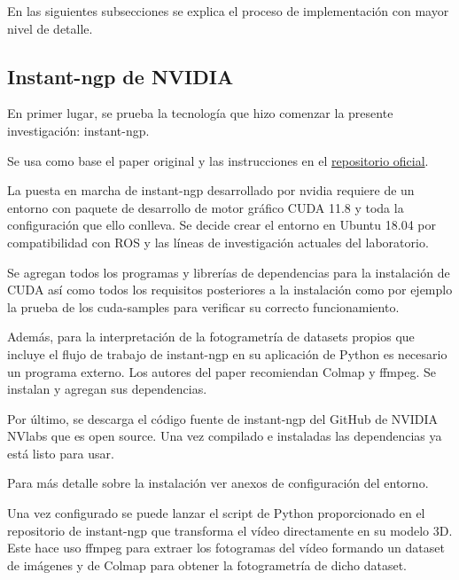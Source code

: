 \documentclass[a4paper, 12pt, spanish, twoside]{article}
\begin{document}
En las siguientes subsecciones se explica el proceso de implementación con mayor nivel de detalle. 





\subsection{Instant-ngp de NVIDIA} 

En primer lugar, se prueba la tecnología que hizo comenzar la presente investigación: \gls{instant-ngp}. 

Se usa como base el paper original y las instrucciones en el \href{https://github.com/NVlabs/instant-ngp}{repositorio oficial}.  

La puesta en marcha de \gls{instant-ngp} desarrollado por \gls{nvidia} requiere de un entorno con paquete de desarrollo de motor gráfico CUDA 11.8 y toda la configuración que ello conlleva. Se decide crear el entorno en Ubuntu 18.04 por compatibilidad con ROS y las líneas de investigación actuales del laboratorio. 

Se agregan todos los programas y librerías de dependencias para la instalación de CUDA así como todos los requisitos posteriores a la instalación como por ejemplo la prueba de los cuda-samples para verificar su correcto funcionamiento. 

Además, para la interpretación de la fotogrametría de datasets propios que incluye el flujo de trabajo de instant-ngp en su aplicación de Python es necesario un programa externo. Los autores del paper recomiendan Colmap y ffmpeg. Se instalan y agregan sus dependencias. 

Por último, se descarga el código fuente de instant-ngp del GitHub de NVIDIA NVlabs que es open source. Una vez compilado e instaladas las dependencias ya está listo para usar. 

Para más detalle sobre la instalación ver anexos de configuración del entorno. 

Una vez configurado se puede lanzar el script de Python proporcionado en el repositorio de instant-ngp que transforma el vídeo directamente en su modelo 3D. Este hace uso ffmpeg para extraer los fotogramas del vídeo formando un dataset de imágenes y de Colmap para obtener la fotogrametría de dicho dataset.  
\end{document}
